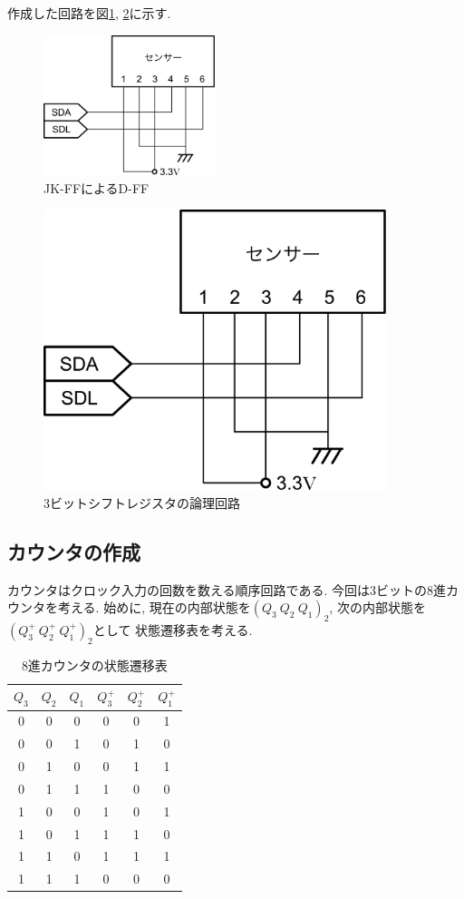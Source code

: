 \documentclass[titlepage]{jsarticle}
\begin{document}
    作成した回路を図\ref{fig:JK-FF_by_D-FF}, \ref{fig:shift_register}に示す.

    \begin{figure}[h]
      \centering
      \includegraphics[width=5cm]{images/haisen.pdf}
      \caption{JK-FFによるD-FF}
      \label{fig:JK-FF_by_D-FF}
    \end{figure}
    \begin{figure}[h]
      \centering
      \includegraphics[width=10cm]{images/haisen.pdf}
      \caption{3ビットシフトレジスタの論理回路}
      \label{fig:shift_register}
    \end{figure}
  \subsection{カウンタの作成}
    カウンタはクロック入力の回数を数える順序回路である.
    今回は3ビットの8進カウンタを考える.
    始めに, 現在の内部状態を$(Q_3 \ Q_2 \ Q_1)_2$, 次の内部状態を$(Q_3^+ \ Q_2^+ \ Q_1^+)_2$として
    状態遷移表を考える.
    \begin{table}[h]
      \caption{8進カウンタの状態遷移表}
      \label{tab:counter}
      \centering
      \begin{tabular}{ccc||ccc}
        \hline
        $Q_3$ & $Q_2$ & $Q_1$ & $Q_3^+$ & $Q_2^+$ & $Q_1^+$ \\ \hline \hline
        0 & 0 & 0 & 0 & 0 & 1 \\
        0 & 0 & 1 & 0 & 1 & 0 \\
        0 & 1 & 0 & 0 & 1 & 1 \\
        0 & 1 & 1 & 1 & 0 & 0 \\
        1 & 0 & 0 & 1 & 0 & 1 \\
        1 & 0 & 1 & 1 & 1 & 0 \\
        1 & 1 & 0 & 1 & 1 & 1 \\
        1 & 1 & 1 & 0 & 0 & 0 \\ \hline
      \end{tabular}
    \end{table}
\end{document}
